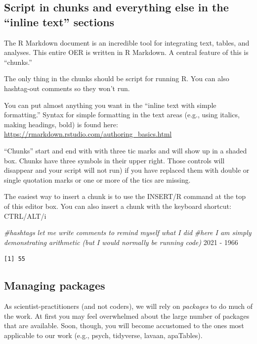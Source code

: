 \documentclass[
  11pt,
]{book}
\newenvironment{Shaded}{\begin{snugshade}}{\end{snugshade}}
\newcommand{\CommentTok}[1]{\textcolor[rgb]{0.56,0.35,0.01}{\textit{#1}}}
\newcommand{\DecValTok}[1]{\textcolor[rgb]{0.00,0.00,0.81}{#1}}
\newcommand{\SpecialCharTok}[1]{\textcolor[rgb]{0.00,0.00,0.00}{#1}}
\begin{document}
\hypertarget{script-in-chunks-and-everything-else-in-the-inline-text-sections}{%
\subsection{Script in chunks and everything else in the ``inline text'' sections}\label{script-in-chunks-and-everything-else-in-the-inline-text-sections}}

The R Markdown document is an incredible tool for integrating text, tables, and analyses. This entire OER is written in R Markdown. A central feature of this is ``chunks.''

The only thing in the chunks should be script for running R. You can also hashtag-out comments so they won't run.

You can put almost anything you want in the ``inline text with simple formatting.'' Syntax for simple formatting in the text areas (e.g., using italics, making headings, bold) is found here: \url{https://rmarkdown.rstudio.com/authoring_basics.html}

``Chunks'' start and end with with three tic marks and will show up in a shaded box. Chunks have three symbols in their upper right. Those controls will disappear and your script will not run) if you have replaced them with double or single quotation marks or one or more of the tics are missing.

The easiest way to insert a chunk is to use the INSERT/R command at the top of this editor box. You can also insert a chunk with the keyboard shortcut: CTRL/ALT/i

\begin{Shaded}
\begin{Highlighting}[]
\CommentTok{\#hashtags let me write comments to remind myself what I did}
\CommentTok{\#here I am simply demonstrating arithmetic (but I would normally be running code)}
\DecValTok{2021} \SpecialCharTok{{-}} \DecValTok{1966}
\end{Highlighting}
\end{Shaded}

\begin{verbatim}
[1] 55
\end{verbatim}

\hypertarget{managing-packages}{%
\subsection{Managing packages}\label{managing-packages}}

As scientist-practitioners (and not coders), we will rely on \emph{packages} to do much of the work. At first you may feel overwhelmed about the large number of packages that are available. Soon, though, you will become accustomed to the ones most applicable to our work (e.g., psych, tidyverse, lavaan, apaTables).
\end{document}
